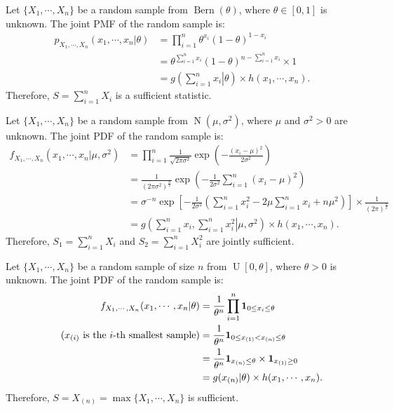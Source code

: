 \documentclass{huhtakm-template-book-v2}
\DeclareMathOperator{\Bern}{Bern}
\DeclareMathOperator{\N}{N}
\DeclareMathOperator{\U}{U}
\begin{document}
    \begin{eg}
        \label{Chapter 1 (Example) Sufficient statistics of Bern(theta)}
        Let $\{X_{1}, \cdots, X_{n}\}$ be a random sample from $\Bern(\theta)$, where $\theta \in [0, 1]$ is unknown. The joint PMF of the random sample is:
        \begin{align*}
            p_{X_{1}, \cdots, X_{n}}(x_{1}, \cdots, x_{n} | \theta) &= \prod_{i=1}^{n} \theta^{x_{i}}(1 - \theta)^{1 - x_{i}}\\
            &= \theta^{\sum_{i=1}^{n} x_{i}}(1 - \theta)^{n - \sum_{i=1}^{n} x_{i}} \times 1\\
            &= g\left(\left.\sum_{i=1}^{n} x_{i}\right| \theta\right) \times h(x_{1}, \cdots, x_{n}).
        \end{align*}
        Therefore, $S = \sum_{i=1}^{n} X_{i}$ is a sufficient statistic.
    \end{eg}
    \begin{eg}
        Let $\{X_{1}, \cdots, X_{n}\}$ be a random sample from $\N(\mu, \sigma^{2})$, where $\mu$ and $\sigma^{2} > 0$ are unknown. The joint PDF of the random sample is:
        \begin{align*}
            f_{X_{1}, \cdots, X_{n}}(x_{1}, \cdots, x_{n} | \mu, \sigma^{2}) &= \prod_{i=1}^{n} \frac{1}{\sqrt{2\pi\sigma^{2}}} \exp\left(-\frac{(x_{i} - \mu)^{2}}{2\sigma^{2}}\right)\\
            &= \frac{1}{(2\pi\sigma^{2})^{\frac{n}{2}}} \exp\left(-\frac{1}{2\sigma^{2}} \sum_{i=1}^{n} (x_{i} - \mu)^{2}\right)\\
            &= \sigma^{-n} \exp\left[-\frac{1}{2\sigma^{2}}\left(\sum_{i=1}^{n} x_{i}^{2} - 2\mu \sum_{i=1}^{n} x_{i} + n\mu^{2}\right)\right] \times \frac{1}{(2\pi)^{\frac{n}{2}}}\\
            &= g\left(\left.\sum_{i=1}^{n} x_{i}, \sum_{i=1}^{n} x_{i}^{2}\right| \mu, \sigma^{2}\right) \times h(x_{1}, \cdots, x_{n}).
        \end{align*}
        Therefore, $S_{1} = \sum_{i=1}^{n} X_{i}$ and $S_{2} = \sum_{i=1}^{n} X_{i}^{2}$ are jointly sufficient.
    \end{eg}
    \begin{eg}
        \label{Chapter 3 (Example) Sufficient statistic for U[0,theta]}
        Let $\{X_{1}, \cdots, X_{n}\}$ be a random sample of size $n$ from $\U[0, \theta]$, where $\theta > 0$ is unknown. The joint PDF of the random sample is:
        \begin{align*}
            f_{X_{1}, \cdots, X_{n}}(x_{1}, \cdots, x_{n} | \theta) &= \frac{1}{\theta^{n}} \prod_{i=1}^{n} \mathbf{1}_{0 \leq x_{i} \leq \theta}\\
            \tag{$x_{(i)}$ is the $i$-th smallest sample}
            &= \frac{1}{\theta^{n}} \mathbf{1}_{0 \leq x_{(1)} < x_{(n)} \leq \theta}\\
            &= \frac{1}{\theta^{n}} \mathbf{1}_{x_{(n)} \leq \theta} \times \mathbf{1}_{x_{(1)} \geq 0}\\
            &= g(x_{(n)} | \theta) \times h(x_{1}, \cdots, x_{n}).
        \end{align*}
        Therefore, $S = X_{(n)} = \max\{X_{1}, \cdots, X_{n}\}$ is sufficient.
    \end{eg}
\end{document}
